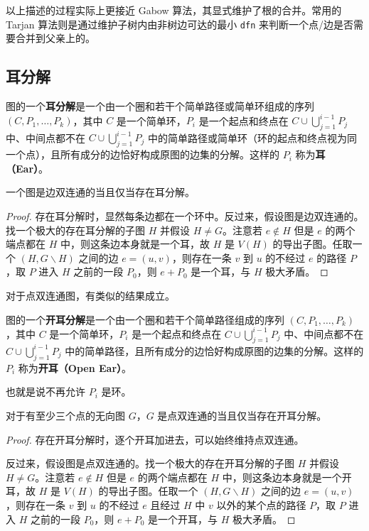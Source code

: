 以上描述的过程实际上更接近 Gabow 算法，其显式维护了根的合并。常用的 Tarjan 算法则是通过维护子树内由非树边可达的最小 \texttt{dfn} 来判断一个点/边是否需要合并到父亲上的。

\subsection{耳分解}

\begin{definition}[耳和耳分解]
    图的一个\textbf{耳分解}是一个由一个圈和若干个简单路径或简单环组成的序列 $(C,P_1,\ldots,P_k)$，其中 $C$ 是一个简单环，$P_i$ 是一个起点和终点在 $C\cup \bigcup_{j=1}^{i-1} P_j$ 中、中间点都不在 $C\cup \bigcup_{j=1}^{i-1} P_j$ 中的简单路径或简单环（环的起点和终点视为同一个点），且所有成分的边恰好构成原图的边集的分解。这样的 $P_i$ 称为\textbf{耳（Ear）}。
\end{definition}

\begin{theorem}
    一个图是边双连通的当且仅当存在耳分解。
\end{theorem}
\begin{proof}
    存在耳分解时，显然每条边都在一个环中。反过来，假设图是边双连通的。找一个极大的存在耳分解的子图 $H$ 并假设 $H\ne G$。注意若 $e\notin H$ 但是 $e$ 的两个端点都在 $H$ 中，则这条边本身就是一个耳，故 $H$ 是 $V(H)$ 的导出子图。任取一个 $(H,G\backslash H)$ 之间的边 $e=(u,v)$，则存在一条 $v$ 到 $u$ 的不经过 $e$ 的路径 $P$，取 $P$ 进入 $H$ 之前的一段 $P_0$，则 $e+P_0$ 是一个耳，与 $H$ 极大矛盾。
\end{proof}

对于点双连通图，有类似的结果成立。
\begin{definition}[开耳和开耳分解]
    图的一个\textbf{开耳分解}是一个由一个圈和若干个简单路径组成的序列 $(C,P_1,\ldots,P_k)$，其中 $C$ 是一个简单环，$P_i$ 是一个起点和终点在 $C\cup \bigcup_{j=1}^{i-1} P_j$ 中、中间点都不在 $C\cup \bigcup_{j=1}^{i-1} P_j$ 中的简单路径，且所有成分的边恰好构成原图的边集的分解。这样的 $P_i$ 称为\textbf{开耳（Open Ear）}。
\end{definition}
\begin{remark}
    也就是说不再允许 $P_i$ 是环。
\end{remark}
\begin{theorem}
    对于有至少三个点的无向图 $G$，$G$ 是点双连通的当且仅当存在开耳分解。
\end{theorem}
\begin{proof}
    存在开耳分解时，逐个开耳加进去，可以始终维持点双连通。
    
    反过来，假设图是点双连通的。找一个极大的存在开耳分解的子图 $H$ 并假设 $H\ne G$。注意若 $e\notin H$ 但是 $e$ 的两个端点都在 $H$ 中，则这条边本身就是一个开耳，故 $H$ 是 $V(H)$ 的导出子图。任取一个 $(H,G\backslash H)$ 之间的边 $e=(u,v)$，则存在一条 $v$ 到 $u$ 的不经过 $e$ 且经过 $H$ 中 $v$ 以外的某个点的路径 $P$，取 $P$ 进入 $H$ 之前的一段 $P_0$，则 $e+P_0$ 是一个开耳，与 $H$ 极大矛盾。
\end{proof}

